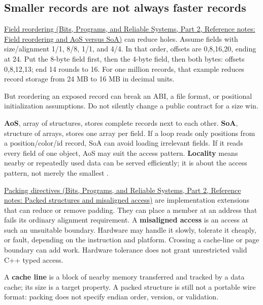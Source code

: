 \subsection{Smaller records are not always faster records}\label{05-engine-i-ch002-smaller-records-are-not-always-faster-records}

\hypertarget{05-engine-i-ch002-smaller-records-are-not-always-faster-records}{}

\href{../01-Bits-Programs-and-Reliable-Systems-P02/main.pdf\#appendix-5522ad176ca0}{Field reordering (Bits, Programs, and Reliable Systems, Part 2, Reference notes: Field reordering and AoS versus SoA)} can reduce holes. Assume fields with size/alignment 1/1, 8/8, 1/1, and 4/4. In that order, offsets are 0,8,16,20, ending at 24. Put the 8-byte field first, then the 4-byte field, then both bytes: offsets 0,8,12,13; end 14 rounds to 16. For one million records, that example reduces record storage from 24 MB to 16 MB in decimal units.

But reordering an exposed record can break an ABI, a file format, or positional initialization assumptions. Do not silently change a public contract for a size win.

\textbf{AoS}, array of structures, stores complete records next to each other. \textbf{SoA}, structure of arrays, stores one array per field. If a loop reads only positions from a position/color/id record, SoA can avoid loading irrelevant fields. If it reads every field of one object, AoS may suit the access pattern. \textbf{Locality} means nearby or repeatedly used data can be served efficiently; it is about the access pattern, not merely the smallest .

\href{../01-Bits-Programs-and-Reliable-Systems-P02/main.pdf\#appendix-0682dbfc5f0e}{Packing directives (Bits, Programs, and Reliable Systems, Part 2, Reference notes: Packed structures and misaligned access)} are implementation extensions that can reduce or remove padding. They can place a member at an address that fails its ordinary alignment requirement. A \textbf{misaligned access} is an access at such an unsuitable boundary. Hardware may handle it slowly, tolerate it cheaply, or fault, depending on the instruction and platform. Crossing a cache-line or page boundary can add work. Hardware tolerance does not grant unrestricted valid C++ typed access.

A \textbf{cache line} is a block of nearby memory transferred and tracked by a data cache; its size is a target property. A packed structure is still not a portable wire format: packing does not specify endian order, version, or validation.

